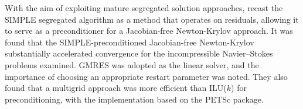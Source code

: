 \documentclass[sn-mathphys,Numbered]{sn-jnl}%
\begin{document}
With the aim of exploiting mature segregated solution approaches, \citet{Pernice2001} recast the SIMPLE segregated algorithm as a method that operates on residuals, allowing it to serve as a preconditioner for a Jacobian-free Newton-Krylov approach.
It was found that the SIMPLE-preconditioned Jacobian-free Newton-Krylov substantially accelerated convergence for the incompressible Navier–Stokes problems examined.
GMRES was adopted as the linear solver, and the importance of choosing an appropriate restart parameter was noted.
They also found that a multigrid approach was more efficient than ILU($k$) for preconditioning, with the implementation based on the PETSc \citep{PETSc} package.
\end{document}
